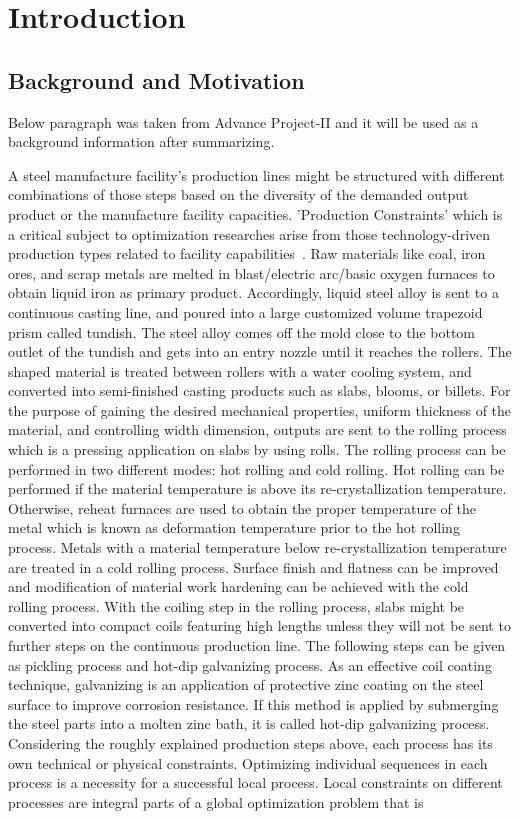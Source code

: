 \chapter{Introduction}

\section{Background and Motivation}
{\color{red} 
	
	Below paragraph was taken from Advance Project-II and it will be used as a background information after summarizing.
	
	A steel manufacture facility's production lines might be structured with different combinations of those steps based on the diversity of the demanded output product or the manufacture facility capacities. 'Production Constraints' which is a critical subject to optimization researches arise from those technology-driven production types related to facility capabilities~\cite{cowling2001design}. Raw materials like coal, iron ores, and scrap metals are melted in blast/electric arc/basic oxygen furnaces to obtain liquid iron as primary product. Accordingly, liquid steel alloy is sent to a continuous casting line, and poured into a large customized volume trapezoid prism called tundish. The steel alloy comes off the mold close to the bottom outlet of the tundish and gets into an entry nozzle until it reaches the rollers. The shaped material is treated between rollers with a water cooling system, and converted into semi-finished casting products such as slabs, blooms, or billets. For the purpose of gaining the desired mechanical properties, uniform thickness of the material, and controlling width dimension, outputs are sent to the rolling process which is a pressing application on slabs by using rolls. The rolling process can be performed in two different modes: hot rolling and cold rolling. Hot rolling can be performed if the material temperature is above its re-crystallization temperature. Otherwise, reheat furnaces are used to obtain the proper temperature of the metal which is known as deformation temperature prior to the hot rolling process. Metals with a material temperature below re-crystallization temperature are treated in a cold rolling process. Surface finish and flatness can be improved and modification of material work hardening can be achieved with the cold rolling process. With the coiling step in the rolling process, slabs might be converted into compact coils featuring high lengths unless they will not be sent to further steps on the continuous production line. The following steps can be given as pickling process and hot-dip galvanizing process. As an effective coil coating technique, galvanizing is an application of protective zinc coating on the steel surface to improve corrosion resistance. If this method is applied by submerging the steel parts into a molten zinc bath, it is called hot-dip galvanizing process. Considering the roughly explained production steps above, each process has its own technical or physical constraints. Optimizing individual sequences in each process is a necessity for a successful local process. Local constraints on different processes are integral parts of a global optimization problem that is }
